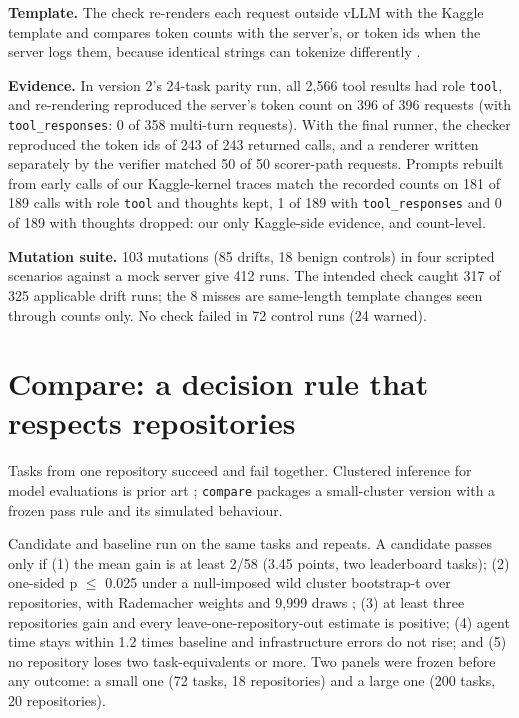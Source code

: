 \textbf{Template.} The check re-renders each request outside vLLM with the Kaggle template and compares token counts with the server's, or token ids when the server logs them, because identical strings can tokenize differently \cite{r16}.

\textbf{Evidence.} In version 2's 24-task parity run, all 2,566 tool results had role \texttt{tool}, and re-rendering reproduced the server's token count on 396 of 396 requests (with \texttt{tool\_responses}: 0 of 358 multi-turn requests). With the final runner, the checker reproduced the token ids of 243 of 243 returned calls, and a renderer written separately by the verifier matched 50 of 50 scorer-path requests. Prompts rebuilt from early calls of our Kaggle-kernel traces match the recorded counts on 181 of 189 calls with role \texttt{tool} and thoughts kept, 1 of 189 with \texttt{tool\_responses} and 0 of 189 with thoughts dropped: our only Kaggle-side evidence, and count-level.

\textbf{Mutation suite.} 103 mutations (85 drifts, 18 benign controls) in four scripted scenarios against a mock server give 412 runs. The intended check caught 317 of 325 applicable drift runs; the 8 misses are same-length template changes seen through counts only. No check failed in 72 control runs (24 warned).

\section{Compare: a decision rule that respects repositories}\label{sec:5}

Tasks from one repository succeed and fail together. Clustered inference for model evaluations is prior art \cite{r19}; \texttt{compare} packages a small-cluster version with a frozen pass rule and its simulated behaviour.

Candidate and baseline run on the same tasks and repeats. A candidate passes only if (1) the mean gain is at least 2/58 (3.45 points, two leaderboard tasks); (2) one-sided p \ensuremath{\le} 0.025 under a null-imposed wild cluster bootstrap-t over repositories, with Rademacher weights and 9,999 draws \cite{r20,r21}; (3) at least three repositories gain and every leave-one-repository-out estimate is positive; (4) agent time stays within 1.2 times baseline and infrastructure errors do not rise; and (5) no repository loses two task-equivalents or more. Two panels were frozen before any outcome: a small one (72 tasks, 18 repositories) and a large one (200 tasks, 20 repositories).

